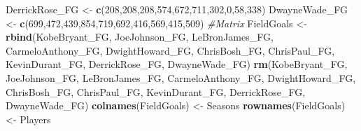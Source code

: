 \documentclass[
]{article}
\newenvironment{Shaded}{\begin{snugshade}}{\end{snugshade}}
\newcommand{\CommentTok}[1]{\textcolor[rgb]{0.56,0.35,0.01}{\textit{#1}}}
\newcommand{\DecValTok}[1]{\textcolor[rgb]{0.00,0.00,0.81}{#1}}
\newcommand{\KeywordTok}[1]{\textcolor[rgb]{0.13,0.29,0.53}{\textbf{#1}}}
\newcommand{\NormalTok}[1]{#1}
\newcommand{\StringTok}[1]{\textcolor[rgb]{0.31,0.60,0.02}{#1}}
\begin{document}
\begin{Shaded}
\begin{Highlighting}[]
\NormalTok{DerrickRose_FG <-}\StringTok{ }\KeywordTok{c}\NormalTok{(}\DecValTok{208}\NormalTok{,}\DecValTok{208}\NormalTok{,}\DecValTok{208}\NormalTok{,}\DecValTok{574}\NormalTok{,}\DecValTok{672}\NormalTok{,}\DecValTok{711}\NormalTok{,}\DecValTok{302}\NormalTok{,}\DecValTok{0}\NormalTok{,}\DecValTok{58}\NormalTok{,}\DecValTok{338}\NormalTok{)}
\NormalTok{DwayneWade_FG <-}\StringTok{ }\KeywordTok{c}\NormalTok{(}\DecValTok{699}\NormalTok{,}\DecValTok{472}\NormalTok{,}\DecValTok{439}\NormalTok{,}\DecValTok{854}\NormalTok{,}\DecValTok{719}\NormalTok{,}\DecValTok{692}\NormalTok{,}\DecValTok{416}\NormalTok{,}\DecValTok{569}\NormalTok{,}\DecValTok{415}\NormalTok{,}\DecValTok{509}\NormalTok{)}
\CommentTok{#Matrix}
\NormalTok{FieldGoals <-}\StringTok{ }\KeywordTok{rbind}\NormalTok{(KobeBryant_FG, JoeJohnson_FG, LeBronJames_FG, CarmeloAnthony_FG, DwightHoward_FG, ChrisBosh_FG, ChrisPaul_FG, KevinDurant_FG, DerrickRose_FG, DwayneWade_FG)}
\KeywordTok{rm}\NormalTok{(KobeBryant_FG, JoeJohnson_FG, LeBronJames_FG, CarmeloAnthony_FG, DwightHoward_FG, ChrisBosh_FG, ChrisPaul_FG, KevinDurant_FG, DerrickRose_FG, DwayneWade_FG)}
\KeywordTok{colnames}\NormalTok{(FieldGoals) <-}\StringTok{ }\NormalTok{Seasons}
\KeywordTok{rownames}\NormalTok{(FieldGoals) <-}\StringTok{ }\NormalTok{Players}


\end{Highlighting}
\end{Shaded}
\end{document}

